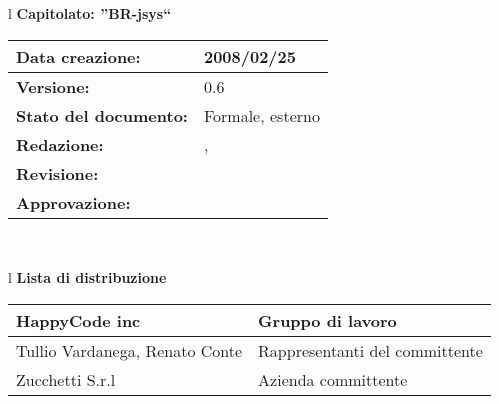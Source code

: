 


\newcommand{\lv}{ 0.6 } %
\newcommand{\dt}{ Manuale Utente }%
\newcommand{\Grammatica}{} %

\begin{center}
\thispagestyle{plain}
\begin{table}[htbp]
\large{
\begin{tabular}{l}
\Large{\textbf{\textsf{Capitolato: ''BR-jsys``}}} \\
\begin{tabular}{|p{6cm}|p{6cm}|} \hline
\textbf{Data creazione:} & 2008/02/25 \\ \hline
\textbf{Versione:} & \lv \\ \hline
\textbf{Stato del documento:} & Formale, esterno \\ \hline
\textbf{Redazione:} &  \AT, \LA \\ \hline
\textbf{Revisione:} & \FC \\ \hline
\textbf{Approvazione:} & \\ \hline
\end{tabular} \\
\end{tabular}
}
\end{table}

\begin{table}[hbtp]
\large{
\begin{tabular}{l}
\Large{\textbf{\textsf{Lista di distribuzione}}} \\

\begin{tabular}{|p{6cm}|p{6cm}|} \hline
{HappyCode inc}& Gruppo di lavoro\\ \hline
{Tullio Vardanega, Renato Conte}& Rappresentanti del committente \\ \hline
{Zucchetti S.r.l}& Azienda committente\\ \hline
\end{tabular} \\
\end{tabular}
}
\end{table}
\begin{table}[hbtp]


\end{table}
\end{center}
